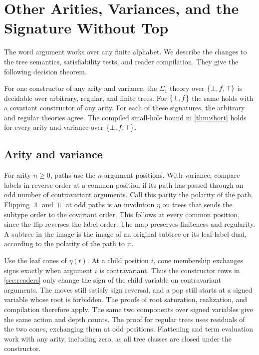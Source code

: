 \section{Other Arities, Variances, and the Signature Without Top}
\label{app:general}

The word argument works over any finite alphabet. We describe the
changes to the tree semantics, satisfiability tests, and reader
compilation. They give the following decision theorem.

\begin{theorem}\label{thm:general}
For one constructor of any arity and variance, the $\Sigma_1$ theory
over $\{\bot,f,\top\}$ is decidable over arbitrary, regular, and finite trees.
For $\{\bot,f\}$ the same holds with a covariant constructor of any arity.
For each of these signatures, the arbitrary and regular theories agree.
The compiled small-hole bound in \cref{thm:short} holds for every
arity and variance over $\{\bot,f,\top\}$.
\end{theorem}

\subsection{Arity and variance}

For arity $n\ge0$, paths use the $n$ argument positions. With variance,
compare labels in reverse order at a common position if its path
has passed through an odd number of contravariant arguments.
Call this parity the polarity of the path. Flipping $\Bot$ and
$\Top$ at odd paths is an involution $\eta$ on trees that sends
the subtype order to the covariant order. This follows at every
common position, since the flip reverses the label order. The map
preserves finiteness and regularity. A subtree in the image is
the image of an original subtree or its leaf-label dual,
according to the polarity of the path to it.

Use the leaf cones of $\eta(t)$. At a child position $i$, cone
membership exchanges signs exactly when argument $i$ is
contravariant. Thus the constructor rows in \cref{sec:readers}
only change the sign of the child variable on contravariant
arguments. The moves still satisfy sign reversal, and a pop
still starts at a signed variable whose root is forbidden.
The proofs of root saturation, realization, and compilation
therefore apply. The same two components over signed variables
give the same action and depth counts. The proof for regular trees
uses residuals of the two cones, exchanging them at odd positions.
Flattening and term evaluation work with any arity, including
zero, as all tree classes are closed under the constructor.

